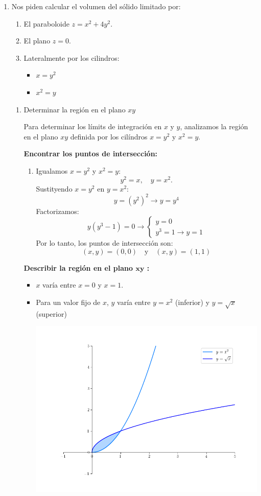 \begin{enumerate}[label=\color{red}\textbf{\arabic*)}, leftmargin=*]
\item {}

Nos piden calcular el volumen del sólido limitado por:
\begin{enumerate}[label=\arabic*)]
  \item El paraboloide $z=x^2+4y^2$.
  \item El plano $z=0$.
  \item Lateralmente por los cilindros:
     \begin{itemize}[label=\textbullet]
      \item $x=y^2$
      \item $x^2=y$
    \end{itemize}
\end{enumerate}
\begin{enumerate}[label=Paso \arabic*:]
  \item Determinar la región en el plano $xy$

    Para determinar los límits de integración en  $x$ y  $y$, analizamos la región en el plano  $xy$ definida por los cilíndros  $x=y^2$ y $x^2=y$.

    \textbf{Encontrar los puntos de intersección:}
    \begin{enumerate}[label=\arabic*)]
      \item Igualamos $x=y^2$ y $x^2=y$: \[
      y^2=x,\quad y=x^2.
      \] 
      Sustityendo $x=y^2$ en $y=x^2$: \[
      y=(y^2)^2\longrightarrow y=y^4
      \] 
      Factorizamos: \[
      y(y^3-1)=0\longrightarrow \begin{cases}
        y=0\\
        y^3=1\longrightarrow y=1
      \end{cases}
      \] 
      Por lo tanto, los puntos de intersección son: \[
        (x,y)=(0,0)\quad\text{y}\quad(x,y)=(1,1)
      \] 
    \end{enumerate}
    \textbf{Describir la región en el plano $\mathbf{xy}$ :}
    \begin{itemize}[label=\textbullet]
      \item $x$ varía entre  $x=0$ y  $x=1$.
      \item Para un valor fijo de  $x$, $y$ varía entre  $y=x^2$ (inferior) y $y=\sqrt{x} $  (superior)

\begin{center}
\includegraphics[width=0.5\linewidth]{"figures/Figure 7"}
\end{center}


\end{itemize}
\end{enumerate}
\end{enumerate}
